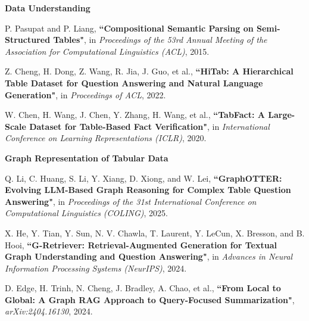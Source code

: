 \vspace*{0.2cm}
\noindent\textbf{Data Understanding}
\begin{enumerate}[start=7,label={[S\arabic*]}]
    \item P. Pasupat and P. Liang, \textbf{``Compositional Semantic Parsing on Semi-Structured Tables"}, in {\it Proceedings of the 53rd Annual Meeting of the Association for Computational Linguistics (ACL)}, 2015.

    \item Z. Cheng, H. Dong, Z. Wang, R. Jia, J. Guo, et al., \textbf{``HiTab: A Hierarchical Table Dataset for Question Answering and Natural Language Generation"}, in {\it Proceedings of ACL}, 2022.

    \item W. Chen, H. Wang, J. Chen, Y. Zhang, H. Wang, et al., \textbf{``TabFact: A Large-Scale Dataset for Table-Based Fact Verification"}, in {\it International Conference on Learning Representations (ICLR)}, 2020.
\end{enumerate}

\vspace*{0.2cm}
\noindent\textbf{Graph Representation of Tabular Data}
\begin{enumerate}[start=10,label={[S\arabic*]}]
    \item Q. Li, C. Huang, S. Li, Y. Xiang, D. Xiong, and W. Lei, \textbf{``GraphOTTER: Evolving LLM-Based Graph Reasoning for Complex Table Question Answering"}, in {\it Proceedings of the 31st International Conference on Computational Linguistics (COLING)}, 2025.

    \item X. He, Y. Tian, Y. Sun, N. V. Chawla, T. Laurent, Y. LeCun, X. Bresson, and B. Hooi, \textbf{``G-Retriever: Retrieval-Augmented Generation for Textual Graph Understanding and Question Answering"}, in {\it Advances in Neural Information Processing Systems (NeurIPS)}, 2024.

    \item D. Edge, H. Trinh, N. Cheng, J. Bradley, A. Chao, et al., \textbf{``From Local to Global: A Graph RAG Approach to Query-Focused Summarization"}, {\it arXiv:2404.16130}, 2024.
\end{enumerate}
